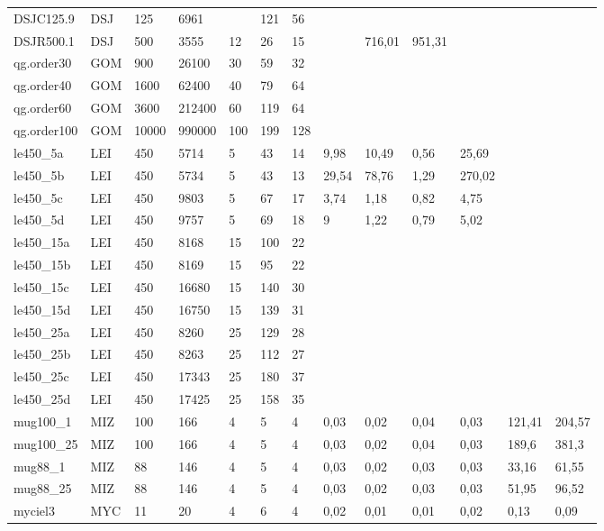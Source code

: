 \documentclass{sig-alternate}
\begin{document}
\begin{table*}[b]
{\begin{tabular}{lllllllllllll}
DSJC125.9 & DSJ & 125 & 6961 &  & 121 & 56 &  &  &  &  &  &  \\
DSJR500.1 & DSJ & 500 & 3555 & 12 & 26 & 15 &  & 716,01 & 951,31 &  &  &  \\
qg.order30 & GOM & 900 & 26100 & 30 & 59 & 32 &  &  &  &  &  &  \\
qg.order40 & GOM & 1600 & 62400 & 40 & 79 & 64 &  &  &  &  &  &  \\
qg.order60 & GOM & 3600 & 212400 & 60 & 119 & 64 &  &  &  &  &  &  \\
qg.order100 & GOM & 10000 & 990000 & 100 & 199 & 128 &  &  &  &  &  &  \\
le450\_5a & LEI & 450 & 5714 & 5 & 43 & 14 & 9,98 & 10,49 & 0,56 & 25,69 &  &  \\
le450\_5b & LEI & 450 & 5734 & 5 & 43 & 13 & 29,54 & 78,76 & 1,29 & 270,02 &  &  \\
le450\_5c & LEI & 450 & 9803 & 5 & 67 & 17 & 3,74 & 1,18 & 0,82 & 4,75 &  &  \\
le450\_5d & LEI & 450 & 9757 & 5 & 69 & 18 & 9 & 1,22 & 0,79 & 5,02 &  &  \\
le450\_15a & LEI & 450 & 8168 & 15 & 100 & 22 &  &  &  &  &  &  \\
le450\_15b & LEI & 450 & 8169 & 15 & 95 & 22 &  &  &  &  &  &  \\
le450\_15c & LEI & 450 & 16680 & 15 & 140 & 30 &  &  &  &  &  &  \\
le450\_15d & LEI & 450 & 16750 & 15 & 139 & 31 &  &  &  &  &  &  \\
le450\_25a & LEI & 450 & 8260 & 25 & 129 & 28 &  &  &  &  &  &  \\
le450\_25b & LEI & 450 & 8263 & 25 & 112 & 27 &  &  &  &  &  &  \\
le450\_25c & LEI & 450 & 17343 & 25 & 180 & 37 &  &  &  &  &  &  \\
le450\_25d & LEI & 450 & 17425 & 25 & 158 & 35 &  &  &  &  &  &  \\
mug100\_1 & MIZ & 100 & 166 & 4 & 5 & 4 & 0,03 & 0,02 & 0,04 & 0,03 & 121,41 & 204,57 \\
mug100\_25 & MIZ & 100 & 166 & 4 & 5 & 4 & 0,03 & 0,02 & 0,04 & 0,03 & 189,6 & 381,3 \\
mug88\_1 & MIZ & 88 & 146 & 4 & 5 & 4 & 0,03 & 0,02 & 0,03 & 0,03 & 33,16 & 61,55 \\
mug88\_25 & MIZ & 88 & 146 & 4 & 5 & 4 & 0,03 & 0,02 & 0,03 & 0,03 & 51,95 & 96,52 \\
myciel3 & MYC & 11 & 20 & 4 & 6 & 4 & 0,02 & 0,01 & 0,01 & 0,02 & 0,13 & 0,09 \\

\end{tabular}}
\end{table*}
\end{document}
